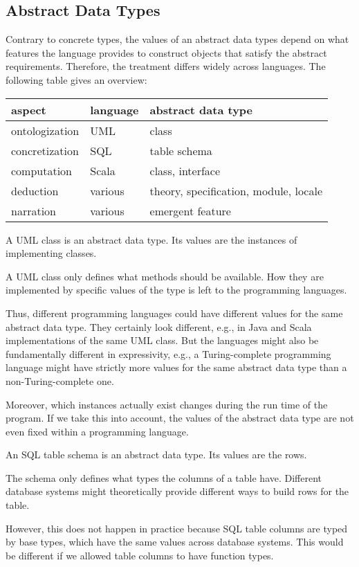 \subsection{Abstract Data Types}

Contrary to concrete types, the values of an abstract data types depend on what features the language provides to construct objects that satisfy the abstract requirements.
Therefore, the treatment differs widely across languages.
The following table gives an overview:

\begin{center}
\begin{tabular}{l|ll}
aspect & language & abstract data type \\
\hline
ontologization & UML & class \\
concretization & SQL & table schema \\
computation & Scala & class, interface \\
deduction & various & theory, specification, module, locale \\
narration & various & emergent feature
\end{tabular}
\end{center}

\begin{example}[Classes]
A UML class is an abstract data type.
Its values are the instances of implementing classes.

A UML class only defines what methods should be available.
How they are implemented by specific values of the type is left to the programming languages.

Thus, different programming languages could have different values for the same abstract data type.
They certainly look different, e.g., in Java and Scala implementations of the same UML class.
But the languages might also be fundamentally different in expressivity, e.g., a Turing-complete programming language might have strictly more values for the same abstract data type than a non-Turing-complete one.

Moreover, which instances actually exist changes during the run time of the program.
If we take this into account, the values of the abstract data type are not even fixed within a programming language.
\end{example}

\begin{example}[Schemas]
An SQL table schema is an abstract data type.
Its values are the rows.

The schema only defines what types the columns of a table have.
Different database systems might theoretically provide different ways to build rows for the table.

However, this does not happen in practice because SQL table columns are typed by base types, which have the same values across database systems.
This would be different if we allowed table columns to have function types.
\end{example}

